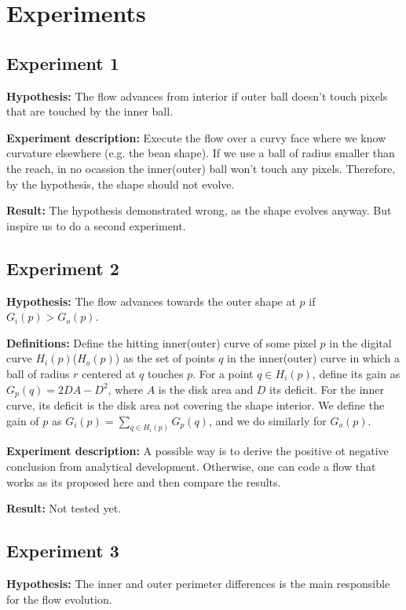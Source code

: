 \section{Experiments}

\subsection{Experiment 1}
\textbf{Hypothesis:} The flow advances from interior if outer ball doesn't touch pixels that are touched by the inner ball.


\textbf{Experiment description:} Execute the flow over a curvy face where we know curvature elsewhere (e.g. the bean shape). If we use a ball of radius smaller than the reach, in no ocassion the inner(outer) ball won't touch any pixels. Therefore, by the hypothesis, the shape should not evolve.


\textbf{Result:} The hypothesis demonstrated wrong, as the shape evolves anyway. But inspire us to do a second experiment.

\subsection{Experiment 2}

\textbf{Hypothesis:} The flow advances towards the outer shape at $p$ if $G_i(p) > G_o(p)$.


\textbf{Definitions:} Define the hitting inner(outer) curve of some pixel $p$ in the digital curve $H_i(p)$($H_o(p)$) as the set of points  $q$ in the inner(outer) curve in which a ball of radius $r$ centered at $q$ touches $p$. For a point $q \in H_i(p)$, define its gain as $G_{p}(q) = 2DA - D^2$, where $A$ is the disk area and $D$ its deficit. For the inner curve, its deficit is the disk area not covering the shape interior. We define the gain of $p$ as $G_i(p) = \sum_{q \in H_i(p)} G_p(q)$, and we do similarly for $G_o(p)$. 


\textbf{Experiment description:} A possible way is to derive the positive ot negative conclusion from analytical development. Otherwise, one can code a flow that works as its proposed here and then compare the results.


\textbf{Result:} Not tested yet.


\subsection{Experiment 3}

\textbf{Hypothesis:} The inner and outer perimeter differences is the main responsible for the flow evolution.

